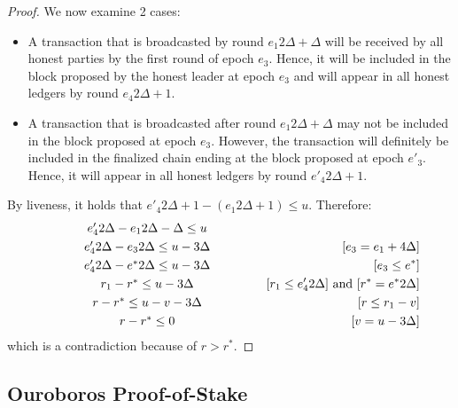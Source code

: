 \begin{proof}
  We now examine 2 cases:
  \begin{itemize}
    \item A transaction that is broadcasted by round $e_1 2 \Delta + \Delta$
      will be received by all honest parties by the first round of epoch $e_3$.
      Hence, it will be included in the block proposed by the honest leader at
      epoch $e_3$ and will appear in all honest ledgers by round $e_4 2 \Delta + 1$.

    \item A transaction that is broadcasted after round $e_1 2 \Delta + \Delta$
      may not be included in the block proposed at epoch $e_3$.
      However, the transaction will definitely be included
      in the finalized chain ending at the block proposed at epoch $e'_3$.
      Hence, it will appear in all honest ledgers by round $e'_4 2 \Delta + 1$.
  \end{itemize}

  By liveness, it holds that $e'_4 2 \Delta + 1 - (e_1 2 \Delta + 1) \leq u$.
  Therefore:
  \begin{align*}
    \makebox[0.5\textwidth][c]{$e'_4 2 \Delta - e_1 2 \Delta - \Delta \leq u$}   && \\
    \makebox[0.5\textwidth][c]{$e'_4 2 \Delta - e_3 2 \Delta \leq u - 3 \Delta$} && \text{[$e_3 = e_1 + 4 \Delta$]} \\
    \makebox[0.5\textwidth][c]{$e'_4 2 \Delta - e^* 2 \Delta \leq u - 3 \Delta$} && \text{[$e_3 \leq e^*$]} \\
    \makebox[0.5\textwidth][c]{$r_1 - r^* \leq u - 3 \Delta$}                    && \text{[$r_1 \leq e'_4 2 \Delta$] and [$r^* = e^* 2 \Delta$]} \\
    \makebox[0.5\textwidth][c]{$r - r^* \leq u - v - 3 \Delta$}                  && \text{[$r \leq r_1 - v$]} \\
    \makebox[0.5\textwidth][c]{$r - r^* \leq 0$}                                 && \text{[$v = u - 3 \Delta$]}
  \end{align*}
  which is a contradiction because of $r > r^*$.

  \Qed
\end{proof}




\subsection{Ouroboros Proof-of-Stake}

